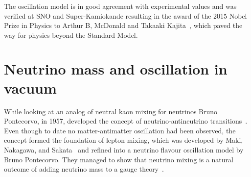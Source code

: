 The oscillation model is in good agreement with experimental values and was verified at SNO and Super-Kamiokande resulting in the award of the 2015 Nobel Prize in Physics to Arthur B, McDonald and Takaaki Kajita~\cite{95Nobel:Online}, which paved the way for physics beyond the Standard Model. %

\section{Neutrino mass and oscillation in vacuum}\label{subsection:Neutrinomassandoscillation}
While looking at an analog of neutral kaon mixing for neutrinos Bruno Pontecorvo, in 1957, developed the concept of neutrino-antineutrino transitions~\cite{11Pontecorvo}. Even though to date no matter-antimatter oscillation had been observed, the concept formed the foundation of lepton mixing, which was developed by Maki, Nakagawa, and Sakata~\cite{12Maki} and refined into a neutrino flavour oscillation model by Bruno Pontecorvo. They managed to show that neutrino mixing is a natural outcome of adding neutrino mass to a gauge theory~\cite{11Pontecorvo}.

